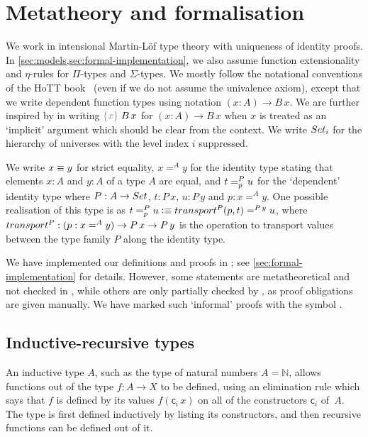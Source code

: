 \documentclass[a4paper,UKenglish,numberwithinsect,cleveref,thm-restate]{lipics-v2021}
\begin{document}

\section{Metatheory and formalisation} \label{sec:meta}

We work in intensional Martin-L\"of type theory with uniqueness of identity proofs. In \cref{sec:models,sec:formal-implementation}, we also assume function extensionality and $\eta$-rules for $\Pi$-types and $\Sigma$-types.
%
We mostly follow the notational conventions of the HoTT book~\cite{UFP2013} (even if we do not assume the univalence axiom), except that we write dependent function types using \Agda notation $(x : A) \to B\,x$.
%
We are further inspired by \Agda in writing $\implicit{x}\;B\,x$ for $(x : A) \to B\,x$ when $x$ is treated as an `implicit' argument which should be clear from the context.
We write $\Set_i$ for the hierarchy of universes with the level index $i$ suppressed.

We write $x \jdeq y$ for strict equality, $x =^{A} y$ for the identity type stating that elements $x : A$ and $y : A$ of a type $A$ are equal, and $\dpath{P}{p}{t}{u}$ for the `dependent' identity type where $P : A \to \Set$, $t : P\,x$, $u : P\,y$ and $p : x =^A y$. One possible realisation of this type is as $t =^{P}_{p} u \defeq \transfib{P}{p}{t} =^{P\,y} u$, where $\transfibf{P} : (p : x =^A y) \to P\,x \to P\,y$ is the operation to transport values between the type family $P$ along the identity type.
%

We have implemented our definitions and proofs in \Agda; see \cref{sec:formal-implementation} for details.
However, some statements are metatheoretical and not checked in \Agda, while others are only partially checked by \Agda, as proof obligations are given manually. %
We have marked such `informal' proofs with the symbol \resizebox*{!}{\baselineskip}{\textdbend}.

\subsection{Inductive-recursive types}
An inductive type $A$, such as the type of natural numbers $A = \mathbb{N}$, allows functions out of the type $f : A \to X$ to be defined, using an elimination rule which says that $f$ is defined by its values $f(\mathsf{c}_i\,x)$ on all of the constructors $\mathsf{c}_i$ of~$A$.
%
The type is first defined inductively by listing its constructors, and then recursive functions can be defined out of it.
\end{document}
